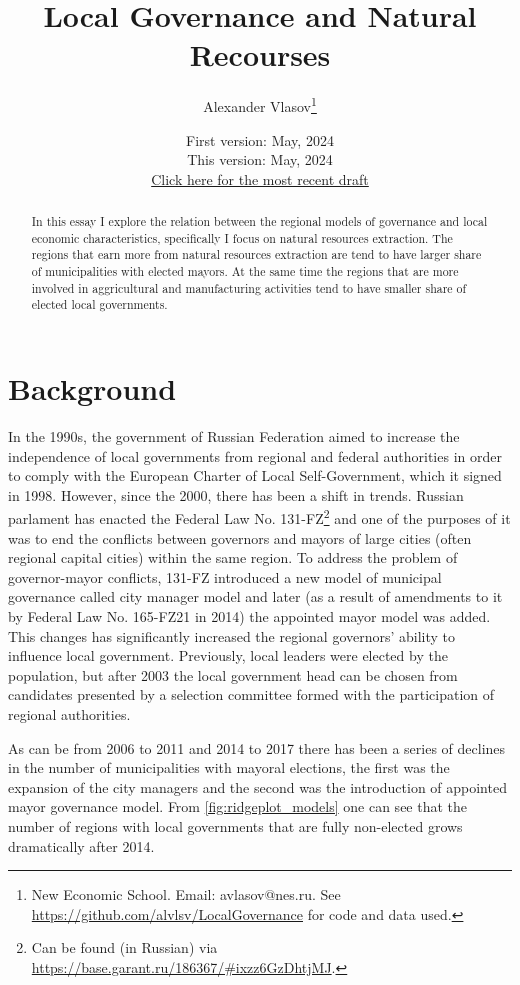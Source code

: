 \documentclass[12pt]{article}
\title{Local Governance and Natural Recourses}
\author{Alexander Vlasov\thanks{New Economic School. Email: avlasov@nes.ru. See \href{https://github.com/alvlsv/LocalGovernance}{https://github.com/alvlsv/LocalGovernance} for code and data used.}}
\date{\normalsize First version: May, 2024\\\vspace{1ex} This version: May, 2024\\ \vspace{1ex}
\href{https:}{Click here for the most recent draft}}
\numberwithin{equation}{section}
\numberwithin{table}{section}
\numberwithin{figure}{section}
\begin{document}
\maketitle
\begin{abstract}
    In this essay I explore the relation between the regional models of governance and local economic characteristics, specifically I focus on natural resources extraction. The regions that earn more from natural resources extraction are tend to have larger share of municipalities with elected mayors. At the same time the regions that are  more involved in aggricultural and manufacturing activities tend to have smaller share of elected local governments.
\end{abstract}


\section{Background}

In the 1990s, the government of Russian Federation aimed to increase the independence of local governments from regional and federal authorities in order to comply with the European Charter of Local Self-Government, which it signed in 1998.
However, since the 2000, there has been a shift in trends. 
Russian parlament has enacted the Federal Law No. 131-FZ\footnote{Can be found (in Russian) via \url{https://base.garant.ru/186367/\#ixzz6GzDhtjMJ}.} and one of the purposes of it was to end the conflicts between governors and mayors of large cities (often regional capital cities) within the same region.
To address the problem of governor-mayor conflicts, 131-FZ introduced a new model of municipal governance called city manager model and later (as a result of amendments to it by Federal Law No. 165-FZ21 in 2014) the appointed mayor model was added. 
This changes has significantly increased the regional governors' ability to influence local government.
Previously, local leaders were elected by the population, but after 2003 the local government head can be chosen from candidates presented by a selection committee formed with the participation of regional authorities.



As can be  from 2006 to 2011 and 2014 to 2017 there has been a series of declines in the number of municipalities with mayoral elections, the first was the expansion of the city managers and the second was the introduction of appointed mayor governance model. From \vref{fig:ridgeplot_models} one can see that the number of regions with local governments that are fully non-elected grows dramatically after 2014.
\end{document}
